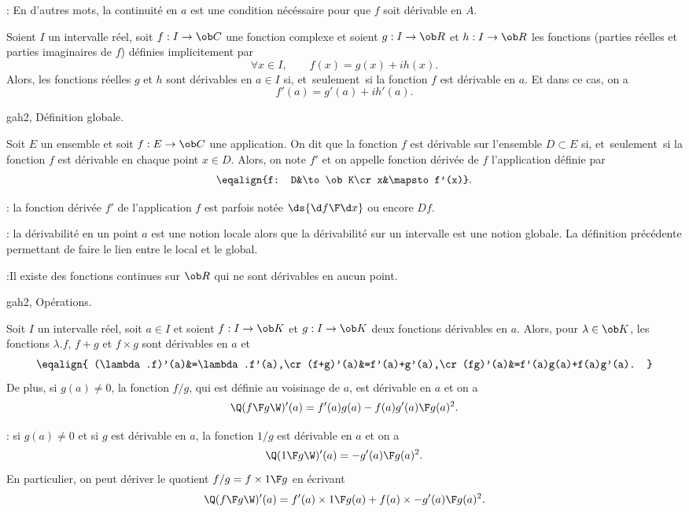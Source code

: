 \Remarque : En d'autres mots, la continuit\'e en $a$ est une condition n\'ec\'essaire pour que $f$ soit d\'erivable en $A$. 
\bigskip

\Theoreme []  Soient $I$ un intervalle r\'eel, soit $f:I\to\ob C$ une fonction complexe et soient $g:I\to\ob R$ et $h:I\to\ob R$ les fonctions (parties r\'eelles et parties imaginaires de $f$) d\'efinies implicitement par  
$$
\forall x\in I,\qquad f(x)=g(x)+ih(x).
$$
Alors, les fonctions r\'eelles $g$ et $h$ sont d\'erivables en $a\in I$ si, et~seulement~si la fonction $f$ 
est d\'erivable en $a$. Et dans ce cas, on a 
$$
f'(a)=g'(a)+ih'(a). 
$$

\Subsection gah2, D\'efinition globale. 


\Definition []  Soit $E$ un ensemble et soit $f:E\to\ob C$ une application. On dit que la fonction $f$ est d\'erivable sur l'ensemble $D\subset E$ si, et~seulement~si la fonction $f$ est d\'erivable en chaque point $x\in D$. Alors, on note $f'$ et on appelle fonction d\'eriv\'ee de $f$ l'application d\'efinie par 
$$
\eqalign{f: D&\to\ob K\cr x&\mapsto f'(x)}.
$$ 

: la fonction d\'eriv\'ee $f'$ de l'application $f$ est parfois not\'ee $\ds {\d f\F \d x}$ ou encore $Df$. 
\bigskip

: la d\'erivabilit\'e en un point $a$ est une notion locale alors que la d\'erivabilit\'e sur un intervalle est une notion globale. La d\'efinition pr\'ec\'edente permettant de faire le lien entre le local et le global. 
\bigskip

:Il existe des fonctions continues sur $\ob R$ qui ne sont d\'erivables en aucun point. 

\Subsection gah2, Op\'erations. 

 \quad
\Theoreme []  Soit $I$ un intervalle r\'eel, soit $a\in I$ et soient $f:I\to\ob K$ et $g:I\to\ob K$ 
\pn
deux fonctions d\'erivables en $a$. 
Alors, pour $\lambda\in\ob K$, les fonctions $\lambda.f$, $f+g$ et $f\times g$ sont d\'erivables en $a$ et 
$$
\eqalign{
(\lambda.f)'(a)&=\lambda.f'(a),\cr
(f+g)'(a)&=f'(a)+g'(a),\cr
(fg)'(a)&=f'(a)g(a)+f(a)g'(a).
}
$$
De plus, si $g(a)\neq 0$, la fonction $f/g$, qui est d\'efinie au voisinage de $a$, est d\'erivable en $a$ et on a 
$$
\Q({f\F g}\W)'(a)={f'(a)g(a)-f(a)g'(a)\F g(a)^2}.
$$

\Remarque : si $g(a)\neq0$ et si $g$ est d\'erivable en $a$, la fonction $1/g$ est d\'erivable en $a$ et on a 
$$
\Q({1\F g}\W)'(a)=-{g'(a)\F g(a)^2}.
$$
En particulier, on peut d\'eriver le quotient $f/g=f\times{1\F g}$ en \'ecrivant 
$$
\Q({f\F g}\W)'(a)=f'(a)\times {1\F g(a)}+f(a)\times{-g'(a)\F g(a)^2}.
$$

